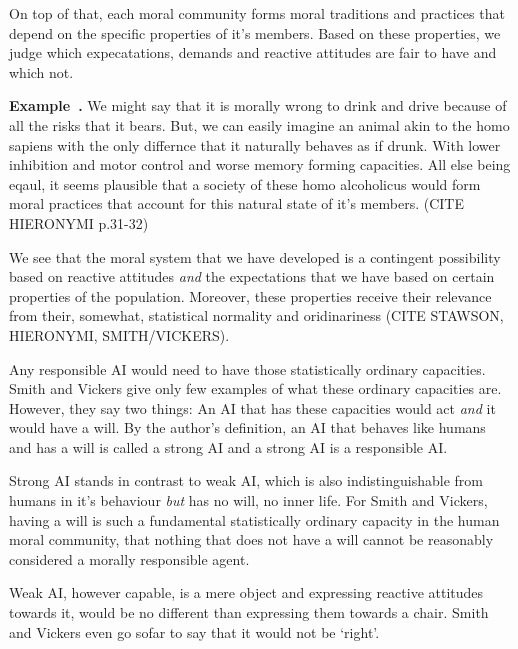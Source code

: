 \documentclass{article}
\newcounter{example}[section]
\newenvironment{example}[1][]{\refstepcounter{example}\par\medskip
   \noindent \textbf{Example~\theexample. #1} \rmfamily}{\medskip}
\begin{document}
On top of that, each moral community forms moral traditions and practices that
depend on the specific properties of it's members. Based on these properties, we
judge which expecatations, demands and reactive attitudes are fair to have and
which not.

\begin{example}
		We might say that it is morally wrong to drink and drive because
		of all the risks that it bears. But, we can easily imagine an
		animal akin to the homo sapiens with the only differnce that it
		naturally behaves as if drunk. With lower inhibition and motor
		control and worse memory forming capacities. All else being
		eqaul, it seems plausible that a society of these homo
		alcoholicus would form moral
		practices that account for this natural state of it's members.
		(CITE HIERONYMI p.31-32)
\end{example}

We see that the moral system that we have developed is a contingent possibility
based on reactive attitudes \textit{and} the expectations that we have based on
certain properties of the population. Moreover, these properties
receive their relevance from their, somewhat, statistical normality and
oridinariness (CITE STAWSON, HIERONYMI, SMITH/VICKERS). 

Any responsible AI would need to have those statistically ordinary capacities.
Smith and Vickers give only few examples of what these ordinary capacities are.
However, they say two things: An AI that has these capacities would act
 \textit{and} it would have a will. 
By the author's definition, an AI that behaves like humans and has a will is
called a strong AI and a strong AI is a responsible AI. 

Strong AI stands in contrast to weak AI, which is also indistinguishable from
humans in it's behaviour \textit{but} has no will, no inner life. For Smith and
Vickers, having a will is such a fundamental statistically ordinary capacity in
the human moral community, that nothing that does not have a will cannot be
reasonably considered a morally responsible agent.

Weak AI, however capable, is a mere object and expressing reactive attitudes
towards it, would be no different than expressing them towards a chair. Smith
and Vickers even go sofar to say that it would not be `right'.\\
\end{document}
